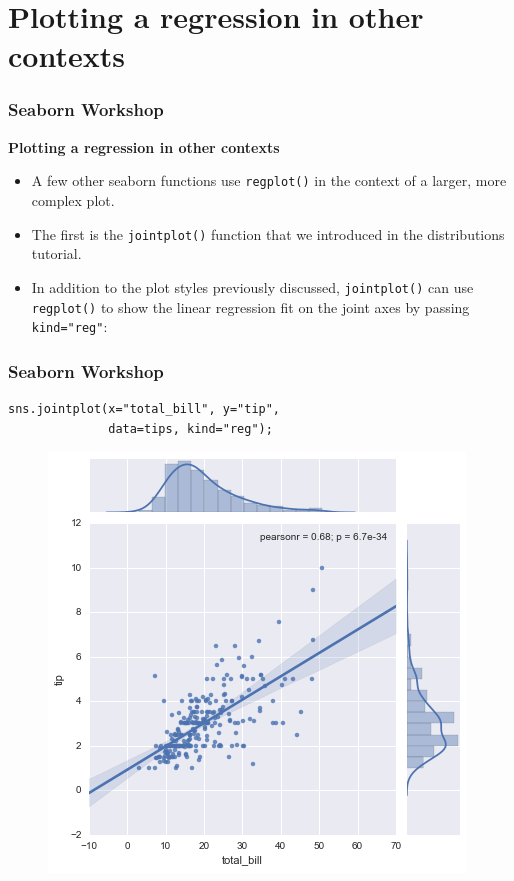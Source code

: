 \documentclass{beamer}
\begin{document}
\section{Plotting a regression in other contexts}
\begin{frame}[fragile]
\frametitle{Seaborn Workshop}
\large
\noindent \textbf{Plotting a regression in other contexts}
	\begin{itemize}
\item A few other seaborn functions use \texttt{regplot()} in the context of a larger, more complex plot. 
\item The first is the \texttt{jointplot()} function that we introduced in the distributions tutorial.
\item In addition to the plot styles previously discussed, \texttt{jointplot()} can use \texttt{regplot()} to show the linear regression fit on the joint axes by passing \texttt{kind="reg"}:
\end{itemize}
\end{frame}
\begin{frame}[fragile]
\frametitle{Seaborn Workshop}
	\large

\begin{verbatim}
sns.jointplot(x="total_bill", y="tip", 
              data=tips, kind="reg");
\end{verbatim}

\begin{figure}
\centering
\includegraphics[width=0.60\linewidth]{images/regression_51_0}
\end{figure}
\end{frame}
\end{document}
